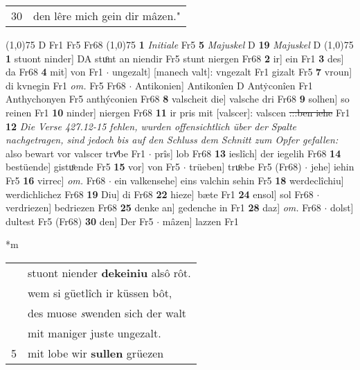 \documentclass[8pt,a4paper,notitlepage]{article}
\begin{document}
\begin{table}[ht]
\begin{minipage}[t]{0.5\linewidth}
\begin{tabular}{rl}
30 & den lêre mich gein dir mâzen."\\ 
\end{tabular}
\scriptsize
\line(1,0){75} \newline
D Fr1 Fr5 Fr68 \newline
\line(1,0){75} \newline
\textbf{1} \textit{Initiale} Fr5  \textbf{5} \textit{Majuskel} D  \textbf{19} \textit{Majuskel} D  \newline
\line(1,0){75} \newline
\textbf{1} stuont ninder] DA stuͦnt an niendir Fr5 stunt niergen Fr68 \textbf{2} ir] ein Fr1 \textbf{3} des] da Fr68 \textbf{4} mit] von Fr1  $\cdot$ ungezalt] [manech valt]: vngezalt Fr1 gizalt Fr5 \textbf{7} vroun] di kvnegin Fr1 \textit{om.} Fr5 Fr68  $\cdot$ Antikonien] Antikonîen D Antẏconîen Fr1 Anthychonyen Fr5 anthýconien Fr68 \textbf{8} valscheit die] valsche dri Fr68 \textbf{9} solhen] so reinen Fr1 \textbf{10} ninder] niergen Fr68 \textbf{11} ir pris mit [valscer]: valscen \sout{:::ben iehe} Fr1 \textbf{12} \textit{Die Verse 427.12-15 fehlen, wurden offensichtlich über der Spalte nachgetragen, sind jedoch bis auf den Schluss dem Schnitt zum Opfer gefallen:} also bewart vor valscer trvͤbe Fr1   $\cdot$ prîs] lob Fr68 \textbf{13} ieslîch] der iegelih Fr68 \textbf{14} bestüende] gistuͦende Fr5 \textbf{15} vor] von Fr5  $\cdot$ trüeben] truͦebe Fr5 (Fr68)  $\cdot$ jehe] iehin Fr5 \textbf{16} virrec] \textit{om.} Fr68  $\cdot$ ein valkensehe] eins valchin sehin Fr5 \textbf{18} werdeclîchiu] werdichlichez Fr68 \textbf{19} Diu] di Fr68 \textbf{22} hieze] bæte Fr1 \textbf{24} ensol] sol Fr68  $\cdot$ verdriezen] bedriezen Fr68 \textbf{25} denke an] gedenche in Fr1 \textbf{28} daz] \textit{om.} Fr68  $\cdot$ dolst] dultest Fr5 (Fr68) \textbf{30} den] Der Fr5  $\cdot$ mâzen] lazzen Fr1 \newline
\end{minipage}
\hspace{0.5cm}
\begin{minipage}[t]{0.5\linewidth}
\small
\begin{center}*m
\end{center}
\begin{tabular}{rl}
 & stuont niender \textbf{dekeiniu} alsô rôt.\\ 
 & wem si güetlîch ir küssen bôt,\\ 
 & des muose \textit{s}wenden sich der walt\\ 
 & mit maniger juste ungezalt.\\ 
5 & mit lobe wir \textbf{sullen} grüezen\\ 

\end{tabular}
\end{minipage}
\end{table}
\end{document}
